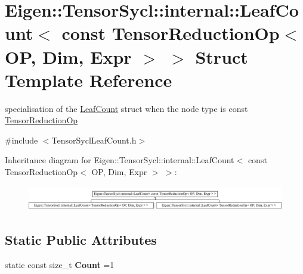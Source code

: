 \hypertarget{struct_eigen_1_1_tensor_sycl_1_1internal_1_1_leaf_count_3_01const_01_tensor_reduction_op_3_01_o_3a46ff7ad197cd08a7e48dc14d038779}{}\section{Eigen\+:\+:Tensor\+Sycl\+:\+:internal\+:\+:Leaf\+Count$<$ const Tensor\+Reduction\+Op$<$ OP, Dim, Expr $>$ $>$ Struct Template Reference}
\label{struct_eigen_1_1_tensor_sycl_1_1internal_1_1_leaf_count_3_01const_01_tensor_reduction_op_3_01_o_3a46ff7ad197cd08a7e48dc14d038779}


specialisation of the \hyperlink{struct_eigen_1_1_tensor_sycl_1_1internal_1_1_leaf_count}{Leaf\+Count} struct when the node type is const \hyperlink{class_eigen_1_1_tensor_reduction_op}{Tensor\+Reduction\+Op}  




{\ttfamily \#include $<$Tensor\+Sycl\+Leaf\+Count.\+h$>$}

Inheritance diagram for Eigen\+:\+:Tensor\+Sycl\+:\+:internal\+:\+:Leaf\+Count$<$ const Tensor\+Reduction\+Op$<$ OP, Dim, Expr $>$ $>$\+:\begin{figure}[H]
\begin{center}
\leavevmode
\includegraphics[height=1.093750cm]{struct_eigen_1_1_tensor_sycl_1_1internal_1_1_leaf_count_3_01const_01_tensor_reduction_op_3_01_o_3a46ff7ad197cd08a7e48dc14d038779}
\end{center}
\end{figure}
\subsection*{Static Public Attributes}
\begin{DoxyCompactItemize}
\item 
\mbox{\label{struct_eigen_1_1_tensor_sycl_1_1internal_1_1_leaf_count_3_01const_01_tensor_reduction_op_3_01_o_3a46ff7ad197cd08a7e48dc14d038779_a412896244b8365d1290be8b0af69f34c}} 
static const size\+\_\+t {\bfseries Count} =1
\end{DoxyCompactItemize}


